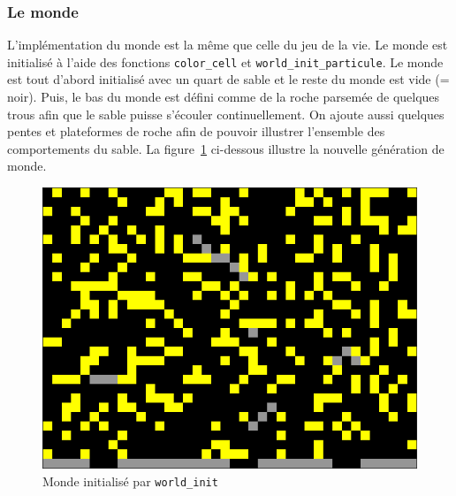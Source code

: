 \documentclass[a4paper]{article}
\begin{document}
\subsubsection{Le monde}
L'implémentation du monde est la même que celle du jeu de la vie. Le monde est initialisé à l'aide des fonctions \texttt{color\_cell} et \texttt{world\_init\_particule}. Le monde est tout d'abord initialisé avec un quart de sable et le reste du monde est vide (= noir). Puis, le bas du monde est défini comme de la roche parsemée de quelques trous afin que le sable puisse s'écouler continuellement. On ajoute aussi quelques pentes et plateformes de roche afin de pouvoir illustrer l'ensemble des comportements du sable. La figure~\ref{fig:world_sand} ci-dessous illustre la nouvelle génération de monde.
\newpage
\begin{figure}[htb]
    \centering
    \includegraphics[scale=0.3]{img/world_sand.png}
    \caption{Monde initialisé par \texttt{world\_init}}
    \label{fig:world_sand}
\end{figure}
\end{document}
